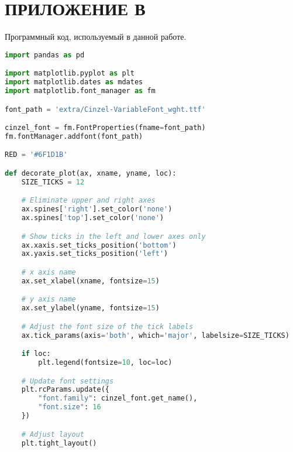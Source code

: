 \section*{ПРИЛОЖЕНИЕ В}



Программный код, используемый в данной работе.

\begin{center}
  \begin{lstlisting}[language=Python]
import pandas as pd

import matplotlib.pyplot as plt
import matplotlib.dates as mdates
import matplotlib.font_manager as fm

font_path = 'extra/Cinzel-VariableFont_wght.ttf'

cinzel_font = fm.FontProperties(fname=font_path)
fm.fontManager.addfont(font_path)

RED = '#6F1D1B'

def decorate_plot(ax, xname, yname, loc):
    SIZE_TICKS = 12

    # Eliminate upper and right axes
    ax.spines['right'].set_color('none')
    ax.spines['top'].set_color('none')

    # Show ticks in the left and lower axes only
    ax.xaxis.set_ticks_position('bottom')
    ax.yaxis.set_ticks_position('left')

    # x axis name
    ax.set_xlabel(xname, fontsize=15)

    # y axis name
    ax.set_ylabel(yname, fontsize=15)

    # Adjust the font size of the tick labels
    ax.tick_params(axis='both', which='major', labelsize=SIZE_TICKS)

    if loc:
        plt.legend(fontsize=10, loc=loc)

    # Update font settings
    plt.rcParams.update({
        "font.family": cinzel_font.get_name(), 
        "font.size": 16
    })

    # Adjust layout
    plt.tight_layout()
  \end{lstlisting}
\end{center}

